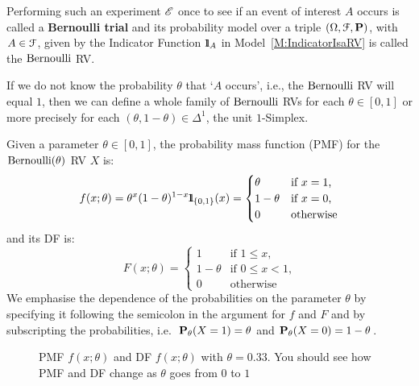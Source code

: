 Performing such an experiment $\mathscr{E}$ once to see if an event of interest $A$ occurs is called a {\bf Bernoulli trial} and its probability model over a triple $(\Omega,\mathcal{F},\mathbf{P})$, with $A \in \mathcal{F}$, given by  the Indicator Function ${1}\mspace{-11 mu}{1}_A$ in Model~\ref{M:IndicatorIsaRV} is called the $\mbox{{\rm Bernoulli}}$ RV. 

If we do not know the probability $\theta$ that `$A$ occurs', i.e., the $\mbox{{\rm Bernoulli}}$ RV will equal $1$, then we can define a whole family of $\mbox{{\rm Bernoulli}}$ RVs for each 
$\theta \in [0,1]$ or more precisely for each $(\theta, 1-\theta) \in \Delta^1$, the unit $1$-Simplex.

\begin{model}[$\bernoulli(\theta)$]
Given a parameter $\theta \in [0,1]$, the probability mass function (PMF) for the $\bernoulli(\theta)$ RV $X$ is:
\begin{equation}\label{E:Bernoullipdf}
f(x;\theta)= \theta^x (1-\theta)^{1-x} {1}\mspace{-11 mu}{1}_{\{0,1\}}(x) =
\begin{cases}
\theta & \text{if $x=1$,}\\
1-\theta & \text{if $x=0$,}\\
0 & \text{otherwise}
\end{cases}
\end{equation}
and its DF is:
\begin{equation}
F(x;\theta) =
\begin{cases}
1 & \text{if $1 \leq x$,}\\
1-\theta & \text{if $0 \leq x < 1$,}\\
0 & \text{otherwise}
\end{cases}
\end{equation}
We emphasise the dependence of the probabilities on the parameter $\theta$ by specifying it following the semicolon in the argument for $f$ and $F$ and by subscripting the probabilities, i.e.~$\mathbf{P}_{\theta}(X=1)=\theta$ and $\mathbf{P}_{\theta}(X=0)=1-\theta$.
\end{model}
\begin{figure}[htpb]
\centering   {}
\caption{PMF $f(x;\theta)$ and DF $f(x;\theta)$ with $\theta = 0.33$. You should see how PMF and DF change as $\theta$ goes from $0$ to $1$}
\end{figure}

